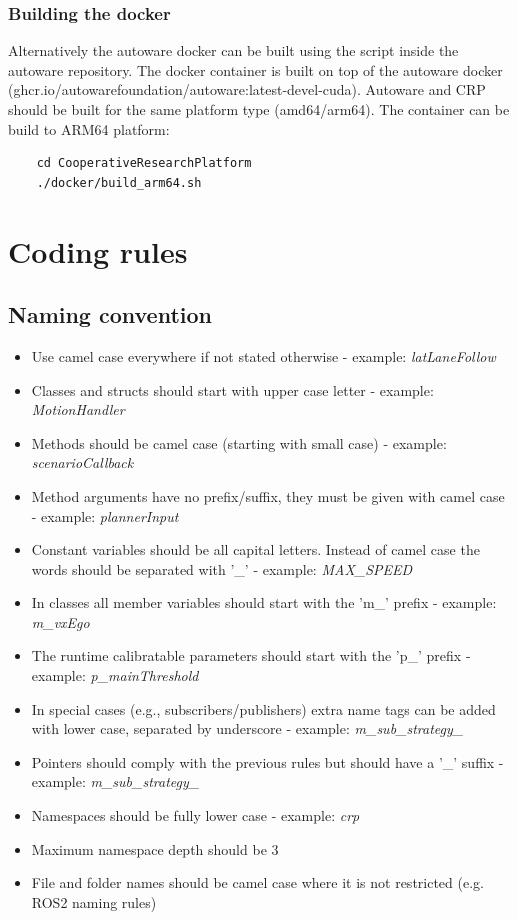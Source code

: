 \documentclass[sn-mathphys-num]{sn-jnl}%
\begin{document}
\subsubsection{Building the docker}
Alternatively the autoware docker can be built using the script inside the autoware repository. The docker container is built on top of the autoware docker (ghcr.io/autowarefoundation/autoware:latest-devel-cuda). Autoware and CRP should be built for the same platform type (amd64/arm64).
\newline
The container can be build to ARM64 platform:
\begin{lstlisting}
    cd CooperativeResearchPlatform
    ./docker/build_arm64.sh
\end{lstlisting}

\section{Coding rules} \label{sec:coding_rules}
\subsection{Naming convention}
\begin{itemize}
    \item Use camel case everywhere if not stated otherwise - example: \emph{latLaneFollow}
    \item Classes and structs should start with upper case letter - example: \emph{MotionHandler}
    \item Methods should be camel case (starting with small case) - example: \emph{scenarioCallback}
    \item Method arguments have no prefix/suffix, they must be given with camel case - example: \emph{plannerInput}
    \item Constant variables should be all capital letters. Instead of camel case the words should be separated with '\_' - example: \emph{MAX\_SPEED}
    \item In classes all member variables should start with the 'm\_' prefix - example: \emph{m\_vxEgo}
    \item The runtime calibratable parameters should start with the 'p\_' prefix - example: \emph{p\_mainThreshold}
    \item In special cases (e.g., subscribers/publishers) extra name tags can be added with lower case, separated by underscore - example: \emph{m\_sub\_strategy\_}
    \item Pointers should comply with the previous rules but should have a '\_' suffix - example: \emph{m\_sub\_strategy\_}
    \item Namespaces should be fully lower case - example: \emph{crp}
    \item Maximum namespace depth should be 3
    \item File and folder names should be camel case where it is not restricted (e.g. ROS2 naming rules)
\end{itemize}
\end{document}
